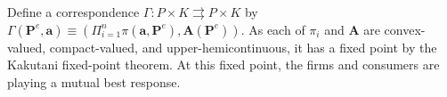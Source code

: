 \documentclass[14pt]{article}
\theoremstyle{plain}
\theoremstyle{definition}
\theoremstyle{remark}
\DeclareRobustCommand\1{\futurelet\oneNext\oneCheck}
\begin{document}
Define a correspondence $\Gamma :P\times K\rightrightarrows P\times K$ by $%
\Gamma \left( \mathbf{P}^{e},\mathbf{a}\right) \equiv \left( \Pi
_{i=1}^{n}\pi \left( \mathbf{a,P}^{e}\right) ,\mathbf{A}\left( \mathbf{P}%
^{e}\right) \right) $. As each of $\pi _{i}$ and $\mathbf{A}$ are
convex-valued, compact-valued, and upper-hemicontinuous, it has a fixed
point by the Kakutani fixed-point theorem. At this fixed point, the firms and consumers are playing a mutual
best response.
\nocite{*}


\end{document}

